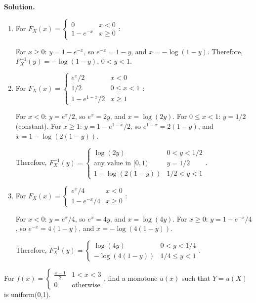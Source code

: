 \noindent\textbf{Solution.}
\begin{enumerate}[label=(\alph*)]
    \item For $F_X(x) = \begin{cases} 0 & x<0 \\ 1-e^{-x} & x\geq 0 \end{cases}$:
    
    For $x \geq 0$: $y = 1-e^{-x}$, so $e^{-x} = 1-y$, and $x = -\log(1-y)$.
    Therefore, $F_X^{-1}(y) = -\log(1-y)$, $0 < y < 1$.
    
    \item For $F_X(x) = \begin{cases} e^x/2 & x<0 \\ 1/2 & 0\leq x<1 \\ 1-e^{1-x}/2 & x\geq 1 \end{cases}$:
    
    For $x < 0$: $y = e^x/2$, so $e^x = 2y$, and $x = \log(2y)$.
    For $0 \leq x < 1$: $y = 1/2$ (constant).
    For $x \geq 1$: $y = 1-e^{1-x}/2$, so $e^{1-x} = 2(1-y)$, and $x = 1-\log(2(1-y))$.
    
    Therefore, $F_X^{-1}(y) = \begin{cases} \log(2y) & 0 < y < 1/2 \\ \text{any value in } [0,1) & y = 1/2 \\ 1-\log(2(1-y)) & 1/2 < y < 1 \end{cases}$.
    
    \item For $F_X(x) = \begin{cases} e^x/4 & x<0 \\ 1-e^{-x}/4 & x\geq 0 \end{cases}$:
    
    For $x < 0$: $y = e^x/4$, so $e^x = 4y$, and $x = \log(4y)$.
    For $x \geq 0$: $y = 1-e^{-x}/4$, so $e^{-x} = 4(1-y)$, and $x = -\log(4(1-y))$.
    
    Therefore, $F_X^{-1}(y) = \begin{cases} \log(4y) & 0 < y < 1/4 \\ -\log(4(1-y)) & 1/4 \leq y < 1 \end{cases}$.
\end{enumerate}

\begin{problembox}
For $f(x) = \begin{cases} \frac{x-1}{2} & 1<x<3 \\ 0 & \text{otherwise} \end{cases}$, find a monotone $u(x)$ such that $Y=u(X)$ is uniform(0,1).
\end{problembox}

